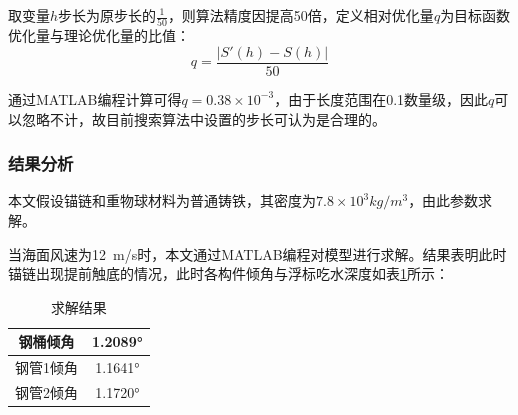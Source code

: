 \documentclass{article}
\numberwithin{equation}{subsection}
\begin{document}
取变量$h$步长为原步长的$\frac{1}{50}$，则算法精度因提高50倍，定义相对优化量$q$为目标函数优化量与理论优化量的比值：
$$q=\frac{|S'(h)-S(h)|}{50}$$

通过MATLAB编程计算可得$q=0.38\times10^{-3}$，由于长度范围在0.1数量级，因此$q$可以忽略不计，故目前搜索算法中设置的步长可认为是合理的。

\subsubsection{结果分析}
本文假设锚链和重物球材料为普通铸铁，其密度为$7.8\times10^{3}kg/m^{3}$，由此参数求解。

当海面风速为\SI{12}{m/s}时，本文通过MATLAB编程对模型进行求解。结果表明此时锚链出现提前触底的情况，此时各构件倾角与浮标吃水深度如表\ref{求解结果1}所示：
\begin{table}[!htbp]
\centering
    \begin{tabular}{c|c}
\hline
钢桶倾角&1.2089°\\
\hline
钢管1倾角&1.1641°\\
\hline
钢管2倾角&1.1720°\\
\hline
    \end{tabular}
    \caption{求解结果}
    \label{求解结果1}
\end{table}
\end{document}
